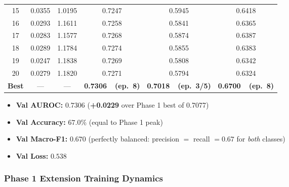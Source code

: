 \documentclass[12pt,a4paper]{article}
\begin{document}
\begin{table}[H]
\begin{tabular}{cccccc}
    15 & 0.0355 & 1.0195 & 0.7247 & 0.5945 & 0.6418 \\
    16 & 0.0293 & 1.1611 & 0.7258 & 0.5841 & 0.6365 \\
    17 & 0.0283 & 1.1577 & 0.7268 & 0.5874 & 0.6387 \\
    18 & 0.0289 & 1.1784 & 0.7274 & 0.5855 & 0.6383 \\
    19 & 0.0247 & 1.1838 & 0.7269 & 0.5808 & 0.6342 \\
    20 & 0.0279 & 1.1820 & 0.7271 & 0.5794 & 0.6324 \\
    \midrule
    \rowcolor{primaryblue!10}
    \textbf{Best} & --- & --- & \textbf{0.7306~~(ep.~8)} & \textbf{0.7018~~(ep.~3/5)} & \textbf{0.6700~~(ep.~8)} \\
    \bottomrule
  \end{tabular}
  \label{tab:results_phase2}
\end{table}

\begin{tcolorbox}[result, title={Best Phase 1 Extension Checkpoint (Epoch 8)}]
  \begin{itemize}
    \item \textbf{Val AUROC:} $0.7306$ \quad(\textbf{+0.0229} over Phase 1 best of 0.7077)
    \item \textbf{Val Accuracy:} $67.0\%$ \quad(equal to Phase 1 peak)
    \item \textbf{Val Macro-F1:} $0.670$ \quad(perfectly balanced: precision $=$ recall $= 0.67$ for \emph{both} classes)
    \item \textbf{Val Loss:} $0.538$
  \end{itemize}
\end{tcolorbox}

\subsubsection{Phase 1 Extension Training Dynamics}
\end{document}
